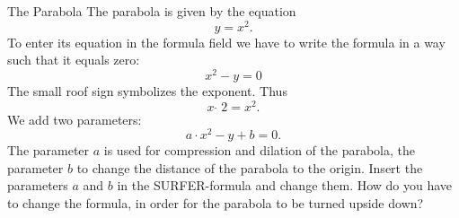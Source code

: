\begin{surferPage}[Parabola]{The Parabola}
The parabola is given by the equation  \[y=x^2.\]
To enter its equation in the formula field we have to write the formula in a way such that it equals zero:
\[x^2-y=0\]
The small roof sign symbolizes the exponent. Thus 
\[ x  \,\hat{\ } \, 2 =x^2.\]
We add two parameters:
\[a \cdot x^2-y+b=0.\]
The parameter $a$ is used for compression and dilation of the parabola, the parameter $b$ to change the distance of the parabola to the origin.
\newline
Insert the parameters $a$ and $b$ in the SURFER-formula and change them. How do you have to change the formula, in order for the parabola to be turned upside down?
\end{surferPage}
